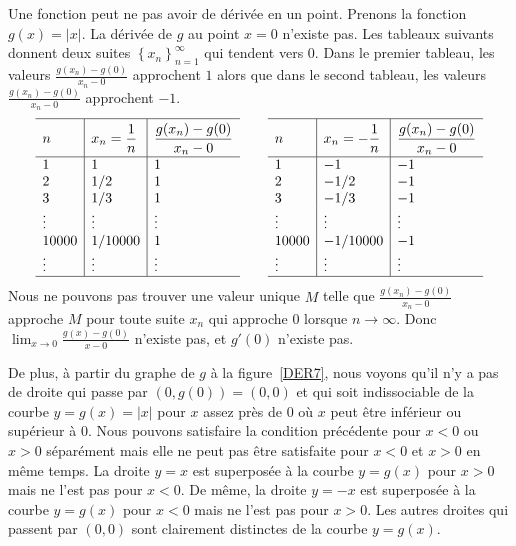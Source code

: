 {\begin{rmk}
Une fonction peut ne pas avoir de dérivée en un point.  Prenons la
fonction $g(x) = |x|$.  La dérivée de $g$ au point $x=0$ n'existe pas.
Les tableaux suivants donnent deux suites
$\displaystyle \left\{x_n\right\}_{n=1}^\infty$ qui tendent vers $0$.
Dans le premier tableau, les valeurs
$\displaystyle \frac{g(x_n)-g(0)}{x_n-0}$
approchent $1$ alors que dans le second tableau, les valeurs
$\displaystyle \frac{g(x_n)-g(0)}{x_n-0}$ approchent $-1$.
\[
\begin{array}{l|l|l}
\hline
\rule[-1em]{0ex}{2.7em} n & \displaystyle x_n = \frac{1}{n} &
\displaystyle \frac{g(x_n)-g(0)}{x_n-0} \\
\hline
1 & 1 & 1 \\
2 & 1/2 & 1 \\
3 & 1/3 & 1 \\
\vdots & \vdots & \vdots \\
10000 & 1/10000 & 1 \\
\vdots & \vdots & \vdots \\
\hline
\end{array}
\qquad
\begin{array}{l|l|l}
\hline
\rule[-1em]{0ex}{2.7em} n & \displaystyle x_n = -\frac{1}{n} &
\displaystyle \frac{g(x_n)-g(0)}{x_n-0} \\
\hline
1 & -1 & -1 \\
2 & -1/2 & -1 \\
3 & -1/3 & -1 \\
\vdots & \vdots & \vdots \\
10000 & -1/10000 & -1 \\
\vdots & \vdots & \vdots \\
\hline
\end{array}
\]
Nous ne pouvons pas trouver une valeur unique $M$ telle que
$\displaystyle \frac{g(x_n)-g(0)}{x_n-0}$ approche $M$ pour toute
suite $x_n$ qui approche $0$ lorsque $n \to \infty$.  Donc
$\displaystyle \lim_{x\rightarrow 0} \frac{g(x)-g(0)}{x-0}$ n'existe 
pas, et $g'(0)$ n'existe pas.

De plus, à partir du graphe de $g$ à la figure~\ref{DER7}, nous voyons
qu'il n'y a pas de droite qui passe par $(0,g(0))=(0,0)$ et qui soit
indissociable de la courbe $y=g(x)=|x|$ pour $x$ assez près de $0$ où
$x$ peut être inférieur ou supérieur à $0$.  Nous pouvons satisfaire la
condition précédente pour $x<0$ ou $x>0$ séparément mais elle ne peut
pas être satisfaite pour $x<0$ et $x>0$ en même temps.  La droite
$y=x$ est superposée à la courbe $y=g(x)$ pour $x>0$ mais ne l'est pas
pour $x<0$.  De même, la droite $y=-x$ est superposée à la courbe
$y=g(x)$ pour $x<0$ mais ne l'est pas pour $x>0$.  Les autres droites
qui passent par $(0,0)$ sont clairement distinctes de la courbe
$y=g(x)$.
\end{rmk}

}
